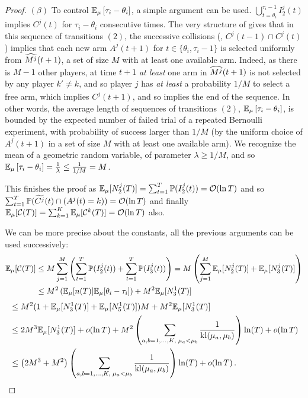 \begin{proof}
  $(\beta)$ To control $\mathbb{E}_{\mu}\left[ \tau_i - \theta_i \right]$,
  a simple argument can be used.
  $\bigcup_{t=\theta_i}^{\tau_i-1} I_2^j(t)$
  implies $C^j(t)$ for $\tau_i - \theta_i$ consecutive times.
  The very structure of \RandTopM{} gives that in this sequence of transitions $(2)$,
  the successive collisions (\ie, $C^j(t-1) \cap C^j(t)$)
  implies that each new arm $A^j(t+1)$ for $t \in \{\theta_i, \tau_i-1\}$ is selected uniformly from
  $\widehat{M^j}(t+1)$,
  a set of size $M$ with at least one available arm.
  Indeed, as there is $M-1$ other players, at time $t+1$ \emph{at least} one arm in $\widehat{M^j}(t+1)$ is not selected by any player $k'\neq k$,
  and so player $j$ has \emph{at least} a probability $1/M$ to select
  a free arm, which implies $\overline{C^j(t+1)}$, and so implies the end of the sequence.
  In other words, the average length of sequences of transitions $(2)$,
  $\mathbb{E}_{\mu}\left[ \tau_i - \theta_i \right]$,
  is bounded by the expected number of failed trial of a repeated Bernoulli experiment, with probability of success larger than $1/M$ (by the uniform choice of $A^j(t+1)$ in a set of size $M$ with at least one available arm).
  We recognize the mean of a geometric random variable, of parameter $\lambda \geq 1/M$, and so $\mathbb{E}_{\mu}\left[ \tau_i - \theta_i \right] = \frac{1}{\lambda} \leq \frac{1}{1/M} = M$.

  This finishes the proof as $\mathbb{E}_{\mu}[N_2^j(T)] = \sum_{t=1}^T \mathbb{P}(I_2^j(t)) = \mathop{}\mathopen{}\mathcal{O}\mathopen{}\left(\ln T\right)$ and so
  $\sum_{t=1}^T \mathbb{P}(\widetilde{C^j}(t) \cap (A^j(t) = k)) = \mathop{}\mathopen{}\mathcal{O}\mathopen{}\left(\ln T\right)$
  and finally
  $\mathbb{E}_{\mu}[\mathcal{C}(T)] = \sum_{k=1}^K \mathbb{E}_{\mu}[\mathcal{C}^k(T)] = \mathop{}\mathopen{}\mathcal{O}\mathopen{}\left(\ln T\right)$ also.

  We can be more precise about the constants, all the previous arguments can be used successively:
  \begin{align}
    \mathbb{E}_{\mu}[\mathcal{C}(T)]
    &\leq M \sum_{j=1}^M \left(\sum_{t=1}^T \mathbb{P}(I_2^j(t)) + \sum_{t=1}^T \mathbb{P}(I_3^j(t))\right)
    = M \left(\sum_{j=1}^M \mathbb{E}_{\mu}[N_2^j(T)] + \mathbb{E}_{\mu}[N_3^j(T)]\right) \\
    &\leq M^2 \left(\mathbb{E}_{\mu}[n(T)] \mathbb{E}_{\mu}[\theta_i - \tau_i] \right) + M^2 \mathbb{E}_{\mu}[N_3^1(T)] \notag
  \end{align}%
  \begin{align}
    &\leq M^2 (1+\mathbb{E}_{\mu}[N_3^1(T)] + \mathbb{E}_{\mu}[N_5^1(T)]) M + M^2 \mathbb{E}_{\mu}[N_3^1(T)] \notag \\
    &\leq 2 M^3 \mathbb{E}_{\mu}[N_3^1(T)] + \mathop{}\mathopen{}o\mathopen{}\left(\ln T\right) + M^2 \left(\sum_{a,b=1,\dots,K,\;\mu_a < \mu_b} \frac{1}{\mathrm{kl}(\mu_a,\mu_b)}\right) \ln(T) + \mathop{}\mathopen{}o\mathopen{}\left(\ln T\right) \notag  \\
    &\leq \left(2 M^3 + M^2\right) \left(\sum_{a,b=1,\dots,K,\;\mu_a < \mu_b} \frac{1}{\mathrm{kl}(\mu_a,\mu_b)}\right) \ln(T) + \mathop{}\mathopen{}o\mathopen{}\left(\ln T\right).
  \end{align}


\end{proof}
